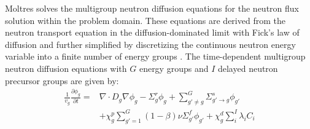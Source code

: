 Moltres solves the multigroup neutron diffusion equations for the neutron
flux solution within the problem domain. These equations are derived from the
neutron transport equation in the diffusion-dominated limit with Fick's law of
diffusion and further simplified by discretizing the continuous neutron energy
variable into a finite number of energy groups \cite{bell_nuclear_1970,
duderstadt_nuclear_1976}. The time-dependent multigroup neutron
diffusion equations with $G$ energy groups and $I$ delayed neutron precursor
groups are given by:
%
\begin{align}
    \frac{1}{v_g} \frac{\partial \phi_g}{\partial t} =& \nabla \cdot D_g
    \nabla \phi_g - \Sigma^r_g \phi_g +
    \sum^G_{g' \neq g} \Sigma^s_{g' \rightarrow g} \phi_{g'} \nonumber \\
    &+ \chi^p_g \sum^G_{g'=1} \left( 1-\beta \right) \nu \Sigma^f_{g'}
    \phi_{g'} + \chi^d_g \sum^I_i \lambda_i C_i \label{eq:neutron} %
\end{align}

